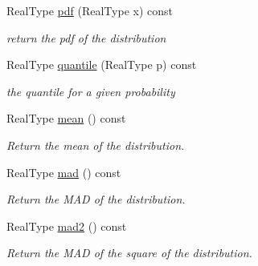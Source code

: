 \begin{DoxyCompactItemize}
\mbox{\label{classpareto__distribution_a8cb3ee0a57c036cd9caecf515db32319}} 
Real\+Type \mbox{\hyperlink{classpareto__distribution_a8cb3ee0a57c036cd9caecf515db32319}{pdf}} (Real\+Type x) const
\begin{DoxyCompactList}\small\item\em return the pdf of the distribution \end{DoxyCompactList}\item 
\mbox{\label{classpareto__distribution_a970d489ff62a6da2bdef99e0bf82461b}} 
Real\+Type \mbox{\hyperlink{classpareto__distribution_a970d489ff62a6da2bdef99e0bf82461b}{quantile}} (Real\+Type p) const
\begin{DoxyCompactList}\small\item\em the quantile for a given probability \end{DoxyCompactList}\item 
\mbox{\label{classpareto__distribution_a5951ce961898e3c1b82dc5a17eb2b1e6}} 
Real\+Type \mbox{\hyperlink{classpareto__distribution_a5951ce961898e3c1b82dc5a17eb2b1e6}{mean}} () const
\begin{DoxyCompactList}\small\item\em Return the mean of the distribution. \end{DoxyCompactList}\item 
\mbox{\label{classpareto__distribution_a18178125ec26f855f5a1b9e5bb1b38e2}} 
Real\+Type \mbox{\hyperlink{classpareto__distribution_a18178125ec26f855f5a1b9e5bb1b38e2}{mad}} () const
\begin{DoxyCompactList}\small\item\em Return the M\+AD of the distribution. \end{DoxyCompactList}\item 
\mbox{\label{classpareto__distribution_ae7a0e96cb0dc175cb7f82aa231f801f2}} 
Real\+Type \mbox{\hyperlink{classpareto__distribution_ae7a0e96cb0dc175cb7f82aa231f801f2}{mad2}} () const
\begin{DoxyCompactList}\small\item\em Return the M\+AD of the square of the distribution. \end{DoxyCompactList}\item 

\end{DoxyCompactItemize}
